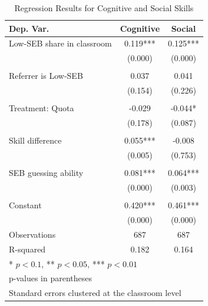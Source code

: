 \documentclass[11pt,a4paper,oneside]{article}
\begin{document}
\begin{table}
\centering
\caption{Regression Results for Cognitive and Social Skills}
\begin{tabular}{@{}lcc@{}}
\toprule
 Dep. Var. & Cognitive & Social \\
\midrule
Low-SEB share in classroom & 0.119*** & 0.125*** \\
 & (0.000) & (0.000) \\
 \\
Referrer is Low-SEB  & 0.037 & 0.041 \\
 & (0.154) & (0.226) \\
 \\
Treatment: Quota  & -0.029 & -0.044* \\
 & (0.178) & (0.087) \\
 \\
Skill difference  & 0.055*** & -0.008 \\
 & (0.005) & (0.753) \\
 \\
SEB guessing ability  & 0.081*** & 0.064*** \\
 & (0.000) & (0.003) \\
 \\
Constant & 0.420*** & 0.461*** \\
 & (0.000) & (0.000) \\
\midrule
Observations & 687 & 687 \\
R-squared & 0.182 & 0.164 \\
\midrule
\multicolumn{3}{l}{* $p<0.1$, ** $p<0.05$, *** $p<0.01$} \\
\multicolumn{3}{l}{p-values in parentheses} \\
\multicolumn{3}{l}{Standard errors clustered at the classroom level} \\
\end{tabular}
\label{tab:regression-results-final}
\end{table}
\end{document}
